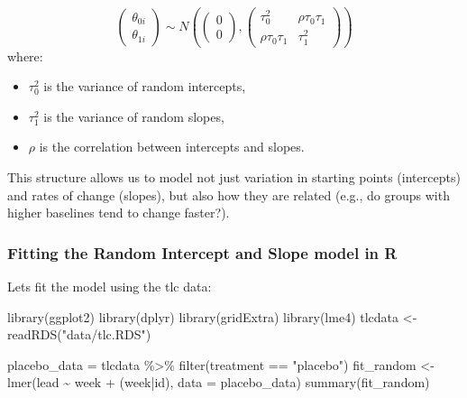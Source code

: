 \documentclass[
  letterpaper,
  DIV=11,
  numbers=noendperiod]{scrreprt}
\newenvironment{Shaded}{\begin{snugshade}}{\end{snugshade}}
\newcommand{\AttributeTok}[1]{\textcolor[rgb]{0.40,0.45,0.13}{#1}}
\newcommand{\FunctionTok}[1]{\textcolor[rgb]{0.28,0.35,0.67}{#1}}
\newcommand{\NormalTok}[1]{\textcolor[rgb]{0.00,0.23,0.31}{#1}}
\newcommand{\OtherTok}[1]{\textcolor[rgb]{0.00,0.23,0.31}{#1}}
\newcommand{\SpecialCharTok}[1]{\textcolor[rgb]{0.37,0.37,0.37}{#1}}
\newcommand{\StringTok}[1]{\textcolor[rgb]{0.13,0.47,0.30}{#1}}
\providecommand{\tightlist}{%
  \setlength{\itemsep}{0pt}\setlength{\parskip}{0pt}}\usepackage{longtable,booktabs,array}
\begin{document}
\[
\begin{pmatrix}\theta_{0i} \\ \theta_{1i} \end{pmatrix} \sim N \left( \begin{pmatrix} 0 \\ 0 \end{pmatrix}, \begin{pmatrix} \tau^2_0 & \rho \tau_0 \tau_1 \\ 
\rho \tau_0 \tau_1 & \tau_1^2 \end{pmatrix} \right)
\] where:

\begin{itemize}
\tightlist
\item
  \(\tau_0^2\) is the variance of random intercepts,
\item
  \(\tau_1^2\) is the variance of random slopes,
\item
  \(\rho\) is the correlation between intercepts and slopes.
\end{itemize}

This structure allows us to model not just variation in starting points
(intercepts) and rates of change (slopes), but also how they are related
(e.g., do groups with higher baselines tend to change faster?).

\hypertarget{fitting-the-random-intercept-and-slope-model-in-r}{%
\subsubsection*{Fitting the Random Intercept and Slope model in
R}\label{fitting-the-random-intercept-and-slope-model-in-r}}

Lets fit the model using the tlc data:

\begin{Shaded}
\begin{Highlighting}[]
\FunctionTok{library}\NormalTok{(ggplot2)}
\FunctionTok{library}\NormalTok{(dplyr)}
\FunctionTok{library}\NormalTok{(gridExtra) }
\FunctionTok{library}\NormalTok{(lme4)}
\NormalTok{tlcdata }\OtherTok{\textless{}{-}} \FunctionTok{readRDS}\NormalTok{(}\StringTok{"data/tlc.RDS"}\NormalTok{)}

\NormalTok{placebo\_data }\OtherTok{=}\NormalTok{ tlcdata }\SpecialCharTok{\%\textgreater{}\%} \FunctionTok{filter}\NormalTok{(treatment }\SpecialCharTok{==} \StringTok{"placebo"}\NormalTok{)}
\NormalTok{fit\_random }\OtherTok{\textless{}{-}} \FunctionTok{lmer}\NormalTok{(lead }\SpecialCharTok{\textasciitilde{}}\NormalTok{ week }\SpecialCharTok{+}\NormalTok{ (week}\SpecialCharTok{|}\NormalTok{id), }\AttributeTok{data =}\NormalTok{ placebo\_data)}
\FunctionTok{summary}\NormalTok{(fit\_random)}
\end{Highlighting}
\end{Shaded}
\end{document}
